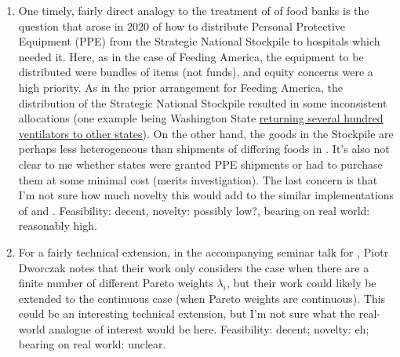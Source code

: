 \documentclass[JEL]{AEA}
\begin{document}
\begin{enumerate}
    \item One timely, fairly direct analogy to the treatment of \cite{prendergast-2017} of food banks is the question that arose in 2020 of how to distribute Personal Protective Equipment (PPE) from the Strategic National Stockpile to hospitals which needed it. Here, as in the case of Feeding America, the equipment to be distributed were bundles of items (not funds), and equity concerns were a high priority. As in the prior arrangement for Feeding America, the distribution of the Strategic National Stockpile resulted in some inconsistent allocations (one example being Washington State \href{governor.wa.gov/news-media/we’re-together-–-washington-state-send-ventilators}{returning several hundred ventilators to other states}). On the other hand, the goods in the Stockpile are perhaps less heterogeneous than shipments of differing foods in \cite{prendergast-2017}. It's also not clear to me whether states were granted PPE shipments or had to purchase them at some minimal cost (merits investigation). The last concern is that I'm not sure how much novelty this would add to the similar implementations of \cite{prendergast-2017} and \cite{budish-2011}. Feasibility: decent, novelty: possibly low?, bearing on real world: reasonably high.
    
    \item For a fairly technical extension, in the accompanying seminar talk for \cite{akbarpour-2020}, Piotr Dworczak notes that their work only considers the case when there are a finite number of different Pareto weights $\lambda_i$, but their work could likely be extended to the continuous case (when Pareto weights are continuous). This could be an interesting technical extension, but I'm not sure what the real-world analogue of interest would be here. Feasibility: decent; novelty: eh; bearing on real world: unclear.
    
\end{enumerate}




\end{document}
